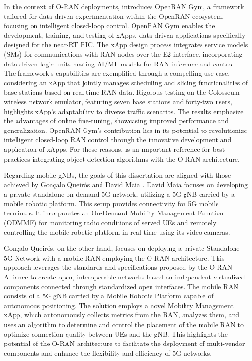 In the context of O-RAN deployments, \cite{xApps} introduces OpenRAN Gym, a framework tailored for data-driven experimentation within the OpenRAN ecosystem, focusing on intelligent closed-loop control. OpenRAN Gym enables the development, training, and testing of xApps, data-driven applications specifically designed for the near-RT RIC. The xApp design process integrates service models (SMs) for communications with RAN nodes over the E2 interface, incorporating data-driven logic units hosting AI/ML models for RAN inference and control. The framework's capabilities are exemplified through a compelling use case, considering an xApp that jointly manages scheduling and slicing functionalities of base stations based on real-time RAN data. Rigorous testing on the Colosseum wireless network emulator, featuring seven base stations and forty-two users, highlights xApp's adaptability to diverse traffic scenarios. The results emphasize the advantages of online fine-tuning, showcasing improved performance and generalization. OpenRAN Gym's contribution lies in its potential to revolutionize intelligent closed-loop RAN control through the innovative development and application of xApps. For these reasons, \cite{xApps} is an important reference for best practices integrating object detection algorithms with the O-RAN architecture.

Regarding mobile gNBs, the goals of this dissertation are aligned with those achieved by Gonçalo Queirós \cite{Goncalo} and David Maia \cite{David}. David Maia focuses on developing a private standalone on-demand 5G network, utilizing a 5G gNB carried by a mobile robotic platform. This setup provides connectivity for 5G mobile terminals. It incorporates an On-Demand Mobility Management Function (ODMMF) for monitoring radio conditions of served UEs and remotely controlling the mobile robotic platform in real-time using its video cameras.

Gonçalo Queirós, on the other hand, focuses on deploying a private Standalone 5G Network with a mobile RAN employing the O-RAN architecture. This approach leverages the standards and specifications proposed by the O-RAN Alliance to create open, interoperable networks based on independent virtualized components connected through standardized open interfaces. The mobile RAN consists of a 5G gNB carried by a Mobile Robotic Platform capable of autonomous positioning. The solution employs a novel Mobility Management xApp, which autonomously collects metrics from the RAN, analyzes them, and uses an algorithm to determine and control the placement of the mobile RAN to optimize connection quality between UEs and the gNB. This highlights the potential of the O-RAN architecture to facilitate the deployment of multi-vendor components and enhance the flexibility and efficiency of 5G networks.

